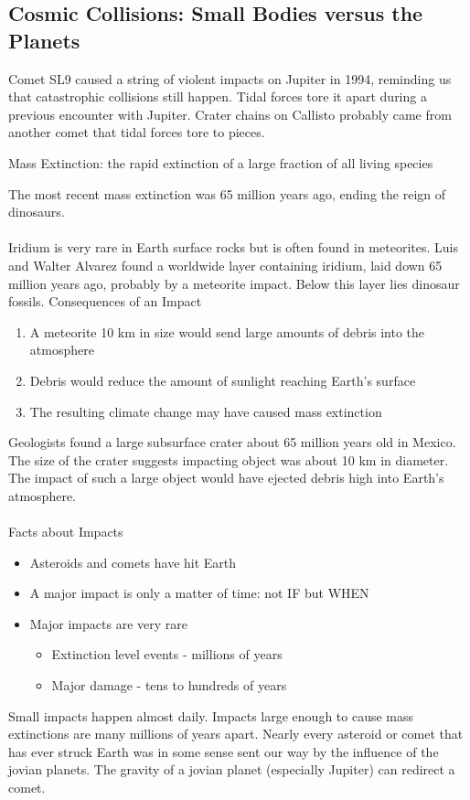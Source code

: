 \documentclass[12pt]{article}
\begin{document}
\subsection{Cosmic Collisions: Small Bodies versus the Planets} 
Comet SL9 caused a string of violent impacts on Jupiter in 1994, reminding us that catastrophic collisions still happen. Tidal forces tore it apart during a previous encounter with Jupiter. Crater chains on Callisto probably came from another comet that tidal forces tore to pieces. 
\begin{definition} Mass Extinction: the rapid extinction of a large fraction of all living species \end{definition} 
The most recent mass extinction was 65 million years ago, ending the reign of dinosaurs. \\~\\
Iridium is very rare in Earth surface rocks but is often found in meteorites. Luis and Walter Alvarez found a worldwide layer containing iridium, laid down 65 million years ago, probably by a meteorite impact. Below this layer lies dinosaur fossils. \newpage
Consequences of an Impact \begin{enumerate} 
\item A meteorite 10 km in size would send large amounts of debris into the atmosphere
\item Debris would reduce the amount of sunlight reaching Earth's surface 
\item The resulting climate change may have caused mass extinction \end{enumerate} 
Geologists found a large subsurface crater about 65 million years old in Mexico. The size of the crater suggests impacting object was about 10 km in diameter. The impact of such a large object would have ejected debris high into Earth's atmosphere. \\~\\
Facts about Impacts \begin{itemize} 
\item Asteroids and comets have hit Earth
\item A major impact is only a matter of time: not IF but WHEN
\item Major impacts are very rare \begin{itemize}
\item Extinction level events - millions of years
\item Major damage - tens to hundreds of years \end{itemize} \end{itemize} 
Small impacts happen almost daily. Impacts large enough to cause mass extinctions are many millions of years apart. Nearly every asteroid or comet that has ever struck Earth was in some sense sent our way by the influence of the jovian planets. The gravity of a jovian planet (especially Jupiter) can redirect a comet. 
\end{document}
